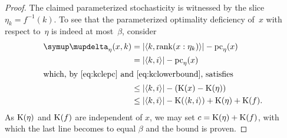 \begin{proof}
  The claimed parameterized stochasticity is witnessed by the slice $\eta_k = f^{-1}(k)$.
  To see that the parameterized optimality deficiency of~$x$ with respect to~$\eta$ is indeed at most~$\beta$, consider
  \begin{align*}
    \updelta_\eta(x, k) &= \length{\pair{k}{\rank(x : \eta_k)}} - \pc_\eta(x) \\
      &= \length{\pair{k}{i}} - \pc_\eta(x) \\
    \intertext{which, by~\eqref{eq:kclepc} and~\eqref{eq:kclowerbound}, satisfies}
      &\le \length{\pair{k}{i}} - (\KC(x) - \KC(\eta)) \\
      &\le \length{\pair{k}{i}} - \KC(\pair{k}{i}) + \KC(\eta) + \KC(f).
  \end{align*}
  As $\operatorname{K}(\eta)$ and $\operatorname{K}(f)$ are independent of $x$, we may set $c = \operatorname{K}(\eta) + \operatorname{K}(f)$, with which the last line becomes to equal $\beta$ and the bound is proven.
\end{proof}


